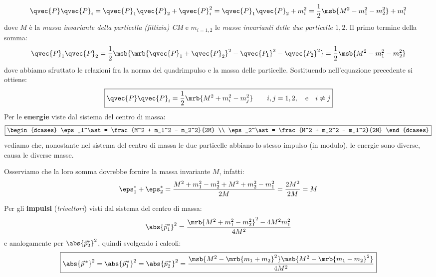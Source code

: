 \begin{equation}
	\qvec{P} \qvec{P}_i
	= \qvec{P}_1 \qvec{P}_2 + \qvec{P}_i^2
	= \qvec{P}_1 \qvec{P}_2 + m_i^2
	= \frac{1}{2} \msb{M^2 - m_1^2 - m_2^2} + m_i^2
\end{equation}
dove $M$ è la \textit{massa invariante della particella (fittizia) CM} e
$m_{i=1,2}$ le \textit{masse invarianti delle due particelle $1,2$}.
Il primo termine della somma:
\begin{equation}
	\qvec{P}_1 \qvec{P}_2
	= \frac{1}{2} \msb{\mrb{\qvec{P}_1 + \qvec{P}_2}^2 - \qvec{P_1}^2 -
		\qvec{P_2}^2}
	= \frac{1}{2} \msb{M^2 - m_1^2 - m_2^2}
\end{equation}
dove abbiamo sfruttato le relazioni fra la norma del quadrimpulso e la massa
delle particelle. Sostituendo nell'equazione precedente si ottiene:
\begin{equation}
	\boxed{
		\qvec{P} \qvec{P}_i
		= \frac{1}{2} \mrb{M^2 + m_i^2 - m_j^2} \qquad i,j
		= 1,2,
		\quad \text{e}
		\quad i\neq j
	}
\end{equation}
Per le \textbf{energie} viste dal sistema del centro di massa:
\begin{equation}
	\boxed{\begin{dcases}
			\eps_1^\ast = \frac{M^2 + m_1^2 - m_2^2}{2M} \\
			\eps_2^\ast = \frac{M^2 + m_2^2 - m_1^2}{2M}
		\end{dcases}}
\end{equation}
vediamo che, nonostante nel sistema del centro di massa le due particelle
abbiano lo stesso impulso (in modulo), le energie sono diverse, causa le diverse
masse.

Osserviamo che la loro somma dovrebbe fornire la massa invariante $M$, infatti:
\begin{equation}
	\eps_1^\ast + \eps_2^*
	= \frac{M^2 + m_1^2 - m_2^2 + M^2 + m_2^2 - m_1^2}{2M}
	= \frac{2M^2}{2M}
	= M
\end{equation}

Per gli \textbf{impulsi} (\textit{trivettori}) visti dal sistema del centro di
massa:
\begin{equation}
	\abs{\vec{p}_{1}^{\ast}}^{2} = \frac{\mrb{M^2 + m_1^2 - m_2^2}^{2} - 4 M^2
		m_1^2}{4M^2}
\end{equation}
e analogamente per $\abs{\vec{p}_{2}^{\ast}}^{2}$, quindi svolgendo i calcoli:
\begin{equation}
	\boxed{
	\abs{\vec{p}^{\,\ast}}^2
	= \abs{\vec{p}_1^{\,\ast}}^2
	= \abs{\vec{p}_2^{\,\ast}}^2
	= \frac{\msb{M^2 - \mrb{m_1 + m_2}^2}\msb{M^2 - \mrb{m_1 - m_2}^2}}{4M^2}
	}
\end{equation}

